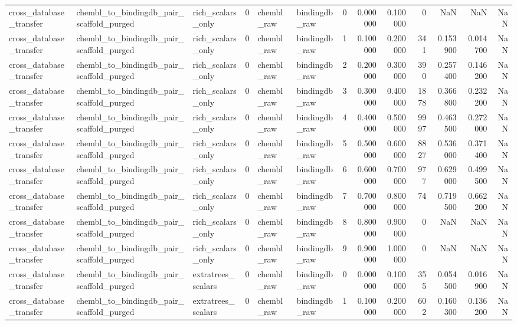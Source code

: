 \begin{longtable}{lllrllrrrrrrr}
cross\_database\_transfer & chembl\_to\_bindingdb\_pair\_scaffold\_purged & rich\_scalars\_only & 0 & chembl\_raw & bindingdb\_raw & 0 & 0.000000 & 0.100000 & 0 & NaN & NaN & NaN \\
cross\_database\_transfer & chembl\_to\_bindingdb\_pair\_scaffold\_purged & rich\_scalars\_only & 0 & chembl\_raw & bindingdb\_raw & 1 & 0.100000 & 0.200000 & 341 & 0.153900 & 0.014700 & NaN \\
cross\_database\_transfer & chembl\_to\_bindingdb\_pair\_scaffold\_purged & rich\_scalars\_only & 0 & chembl\_raw & bindingdb\_raw & 2 & 0.200000 & 0.300000 & 390 & 0.257400 & 0.146200 & NaN \\
cross\_database\_transfer & chembl\_to\_bindingdb\_pair\_scaffold\_purged & rich\_scalars\_only & 0 & chembl\_raw & bindingdb\_raw & 3 & 0.300000 & 0.400000 & 1878 & 0.366800 & 0.232200 & NaN \\
cross\_database\_transfer & chembl\_to\_bindingdb\_pair\_scaffold\_purged & rich\_scalars\_only & 0 & chembl\_raw & bindingdb\_raw & 4 & 0.400000 & 0.500000 & 9997 & 0.463500 & 0.272000 & NaN \\
cross\_database\_transfer & chembl\_to\_bindingdb\_pair\_scaffold\_purged & rich\_scalars\_only & 0 & chembl\_raw & bindingdb\_raw & 5 & 0.500000 & 0.600000 & 8827 & 0.536000 & 0.371400 & NaN \\
cross\_database\_transfer & chembl\_to\_bindingdb\_pair\_scaffold\_purged & rich\_scalars\_only & 0 & chembl\_raw & bindingdb\_raw & 6 & 0.600000 & 0.700000 & 977 & 0.629000 & 0.499500 & NaN \\
cross\_database\_transfer & chembl\_to\_bindingdb\_pair\_scaffold\_purged & rich\_scalars\_only & 0 & chembl\_raw & bindingdb\_raw & 7 & 0.700000 & 0.800000 & 74 & 0.719500 & 0.662200 & NaN \\
cross\_database\_transfer & chembl\_to\_bindingdb\_pair\_scaffold\_purged & rich\_scalars\_only & 0 & chembl\_raw & bindingdb\_raw & 8 & 0.800000 & 0.900000 & 0 & NaN & NaN & NaN \\
cross\_database\_transfer & chembl\_to\_bindingdb\_pair\_scaffold\_purged & rich\_scalars\_only & 0 & chembl\_raw & bindingdb\_raw & 9 & 0.900000 & 1.000000 & 0 & NaN & NaN & NaN \\
cross\_database\_transfer & chembl\_to\_bindingdb\_pair\_scaffold\_purged & extratrees\_scalars & 0 & chembl\_raw & bindingdb\_raw & 0 & 0.000000 & 0.100000 & 355 & 0.054500 & 0.016900 & NaN \\
cross\_database\_transfer & chembl\_to\_bindingdb\_pair\_scaffold\_purged & extratrees\_scalars & 0 & chembl\_raw & bindingdb\_raw & 1 & 0.100000 & 0.200000 & 602 & 0.160300 & 0.136200 & NaN \\

\end{longtable}
